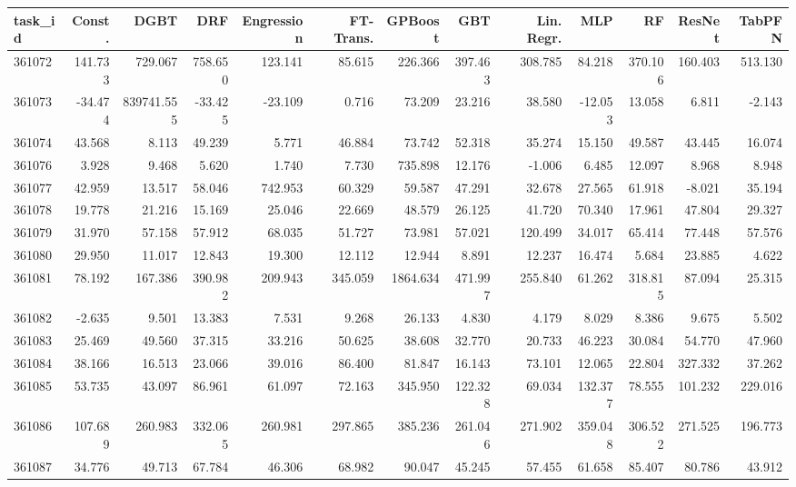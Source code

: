 \begin{tabular}{lrrrrrrrrrrrr}
\toprule
task\_id & Const. & DGBT & DRF & Engression & FT-Trans. & GPBoost & GBT & Lin. Regr. & MLP & RF & ResNet & TabPFN \\
\midrule
361072 & 141.733 & 729.067 & 758.650 & 123.141 & 85.615 & 226.366 & 397.463 & 308.785 & 84.218 & 370.106 & 160.403 & 513.130 \\
361073 & -34.474 & 839741.555 & -33.425 & -23.109 & 0.716 & 73.209 & 23.216 & 38.580 & -12.053 & 13.058 & 6.811 & -2.143 \\
361074 & 43.568 & 8.113 & 49.239 & 5.771 & 46.884 & 73.742 & 52.318 & 35.274 & 15.150 & 49.587 & 43.445 & 16.074 \\
361076 & 3.928 & 9.468 & 5.620 & 1.740 & 7.730 & 735.898 & 12.176 & -1.006 & 6.485 & 12.097 & 8.968 & 8.948 \\
361077 & 42.959 & 13.517 & 58.046 & 742.953 & 60.329 & 59.587 & 47.291 & 32.678 & 27.565 & 61.918 & -8.021 & 35.194 \\
361078 & 19.778 & 21.216 & 15.169 & 25.046 & 22.669 & 48.579 & 26.125 & 41.720 & 70.340 & 17.961 & 47.804 & 29.327 \\
361079 & 31.970 & 57.158 & 57.912 & 68.035 & 51.727 & 73.981 & 57.021 & 120.499 & 34.017 & 65.414 & 77.448 & 57.576 \\
361080 & 29.950 & 11.017 & 12.843 & 19.300 & 12.112 & 12.944 & 8.891 & 12.237 & 16.474 & 5.684 & 23.885 & 4.622 \\
361081 & 78.192 & 167.386 & 390.982 & 209.943 & 345.059 & 1864.634 & 471.997 & 255.840 & 61.262 & 318.815 & 87.094 & 25.315 \\
361082 & -2.635 & 9.501 & 13.383 & 7.531 & 9.268 & 26.133 & 4.830 & 4.179 & 8.029 & 8.386 & 9.675 & 5.502 \\
361083 & 25.469 & 49.560 & 37.315 & 33.216 & 50.625 & 38.608 & 32.770 & 20.733 & 46.223 & 30.084 & 54.770 & 47.960 \\
361084 & 38.166 & 16.513 & 23.066 & 39.016 & 86.400 & 81.847 & 16.143 & 73.101 & 12.065 & 22.804 & 327.332 & 37.262 \\
361085 & 53.735 & 43.097 & 86.961 & 61.097 & 72.163 & 345.950 & 122.328 & 69.034 & 132.377 & 78.555 & 101.232 & 229.016 \\
361086 & 107.689 & 260.983 & 332.065 & 260.981 & 297.865 & 385.236 & 261.046 & 271.902 & 359.048 & 306.522 & 271.525 & 196.773 \\
361087 & 34.776 & 49.713 & 67.784 & 46.306 & 68.982 & 90.047 & 45.245 & 57.455 & 61.658 & 85.407 & 80.786 & 43.912 \\

\end{tabular}
